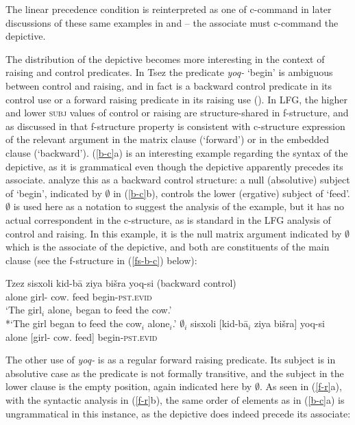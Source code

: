 \documentclass[output=paper,hidelinks]{langscibook}
\begin{document}
The linear precedence condition is reinterpreted as one of c-command in
later discussions of these same examples in \citet{polipots06} and
\citet{fukuda08} -- the associate must c-command the depictive.

The distribution of the depictive becomes more interesting in the
context of raising and control predicates. In Tsez the predicate
\textit{yoq-} `begin' is ambiguous between control and raising, and in
fact is a backward control predicate in its control use or a forward
raising predicate in its raising use (\citealp{polipots06}). In LFG,
the higher and lower \textsc{subj} values of control or raising are
structure-shared in f-structure, and as discussed in
\citet{sellssubsump} that f-structure property is consistent with
c-structure expression of the relevant argument in the matrix clause
(`forward') or in the embedded clause (`backward'). (\ref{b-c}a) is an
interesting example regarding the syntax of the depictive, as it is
grammatical even though the depictive apparently precedes its
associate. \citet{polipots06} analyze this as a backward control
structure: a null (absolutive) subject of `begin', indicated by
$\emptyset$ in (\ref{b-c}b), controls the lower (ergative) subject of
`feed'. $\emptyset$ is used here as a notation to suggest the analysis
of the example, but it has no actual correspondent in the c-structure,
as is standard in the LFG analysis of control and raising. In this
example, it is the null matrix argument indicated by $\emptyset$ which
is the associate of the depictive, and both are constituents of the
main clause (see the f-structure in (\ref{fs-b-c}) below):

\ea\label{b-c} Tzez
\ea
\gll sisxoli kid-b\={a} ziya  bi\v{s}ra  yoq-si (backward control)\\
alone girl-{\ERG}  cow.{\ABS}  feed    begin-\textsc{pst.evid} {}\\
\glt `The girl$_i$ alone$_i$ began to feed the cow.'\\
{*}`The girl began to feed the cow$_i$ alone$_i$.'
\ex
\gll $\emptyset_i$ sisxoli [kid-b\={a}$_i$ ziya  bi\v{s}ra]  yoq-si\\
{} alone [girl-{\ERG}  cow.{\ABS}  feed]    begin-\textsc{pst.evid} \\
\z\z

The other use of \textit{yoq-} is as a regular forward raising
predicate. Its subject is in absolutive case as the predicate is not
formally transitive, and the subject in the lower clause is the empty
position, again indicated here by $\emptyset$. As seen in (\ref{f-r}a),
with the syntactic analysis in (\ref{f-r}b), the same order of elements as
in (\ref{b-c}a) is ungrammatical in this instance, as the depictive does
indeed precede its associate:
\end{document}
